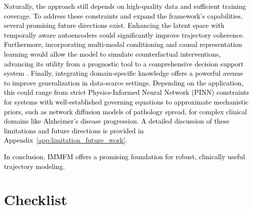 \documentclass[twoside]{article}
\begin{document}
\textcolor{black}{Naturally, the approach still depends on high-quality data and sufficient training coverage. To address these constraints and expand the framework's capabilities, several promising future directions exist. Enhancing the latent space with temporally aware autoencoders \citep{yang2023self, blattmann2023align} could significantly improve trajectory coherence. Furthermore, incorporating multi-modal conditioning \citep{shaik2024survey} and causal representation learning would allow the model to simulate counterfactual interventions, advancing its utility from a prognostic tool to a comprehensive decision support system \citep{von2024causal}. Finally, integrating domain-specific knowledge offers a powerful avenue to improve generalization in data-scarce settings. Depending on the application, this could range from strict Physics-Informed Neural Network (PINN) constraints for systems with well-established governing equations \citep{qian2025physics, cuomo2023scientific} to approximate mechanistic priors, such as network diffusion models of pathology spread, for complex clinical domains like Alzheimer's disease progression. A detailed discussion of these limitations and future directions is provided in Appendix~\ref{app:limitation_future_work}.}

\textcolor{black}{In conclusion, IMMFM offers a promising foundation for robust, clinically useful trajectory modeling.}





% 


\clearpage

\newpage
\section*{Checklist}

\end{document}

